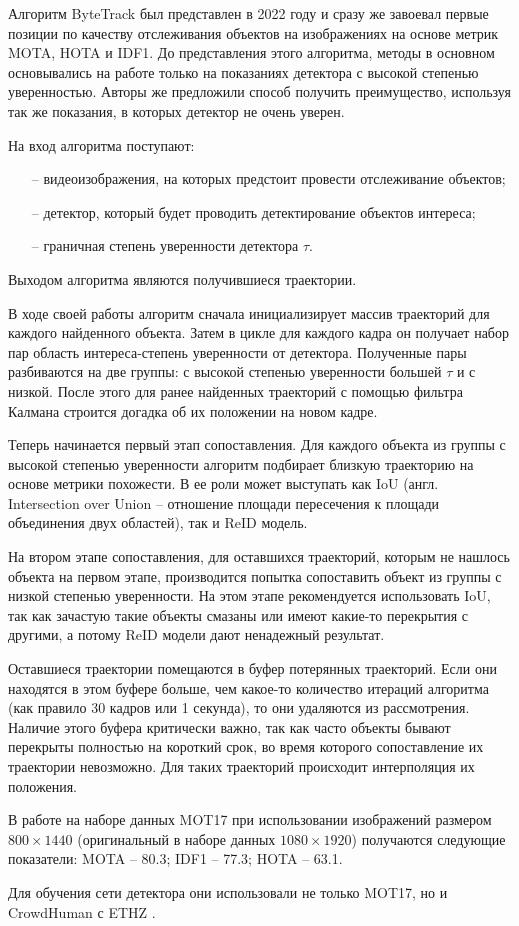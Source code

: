 Алгоритм ByteTrack \cite{zhang2022bytetrack} был представлен в 2022 году и сразу же завоевал первые позиции по качеству отслеживания объектов на изображениях на основе метрик MOTA, HOTA и IDF1.
До представления этого алгоритма, методы в основном основывались на работе только на показаниях детектора с высокой степенью уверенностью. Авторы же предложили способ получить преимущество, используя так же показания, в которых детектор не очень уверен.

На вход алгоритма поступают:
\begin{itemize}
    \item[--] видеоизображения, на которых предстоит провести отслеживание объектов;
    \item[--] детектор, который будет проводить детектирование объектов интереса;
    \item[--] граничная степень уверенности детектора \(\tau\). 
\end{itemize}
Выходом алгоритма являются получившиеся траектории. 

В ходе своей работы алгоритм сначала инициализирует массив траекторий для каждого найденного объекта. 
Затем в цикле для каждого кадра он получает набор пар область интереса-степень уверенности от детектора.
Полученные пары разбиваются на две группы: с высокой степенью уверенности большей \(\tau\) и с низкой. 
После этого для ранее найденных траекторий с помощью фильтра Калмана строится догадка об их положении на новом кадре.

Теперь начинается первый этап сопоставления. Для каждого объекта из группы с высокой степенью уверенности алгоритм подбирает близкую траекторию на основе метрики похожести. В ее роли может выступать как IoU (англ. Intersection over Union -- отношение площади пересечения к площади объединения двух областей), так и ReID модель. 

На втором этапе сопоставления, для оставшихся траекторий, которым не нашлось объекта на первом этапе, производится попытка сопоставить объект из группы с низкой степенью уверенности. На этом этапе рекомендуется использовать IoU, так как зачастую такие объекты смазаны или имеют какие-то перекрытия с другими, а потому ReID модели дают ненадежный результат.

Оставшиеся траектории помещаются в буфер потерянных траекторий. Если они находятся в этом буфере больше, чем какое-то количество итераций алгоритма (как правило 30 кадров или 1 секунда), то они удаляются из рассмотрения. Наличие этого буфера критически важно, так как часто объекты бывают перекрыты полностью на короткий срок, во время которого сопоставление их траектории невозможно. Для таких траекторий происходит интерполяция их положения.

В работе на наборе данных MOT17 при использовании изображений размером \(800 \times 1440\) (оригинальный в наборе данных \(1080 \times 1920\)) получаются следующие показатели: MOTA -- 80.3; IDF1 -- 77.3; HOTA -- 63.1.

Для обучения сети детектора они использовали не только MOT17, но и CrowdHuman \cite{shao2018crowdhuman} с ETHZ \cite{ess2008mobile}.

